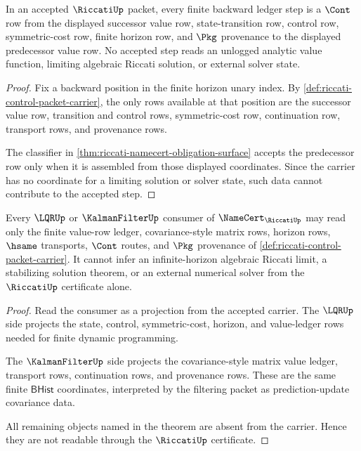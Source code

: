 \begin{theorem}
\label{thm:riccati-finite-ledger-step-closure}
In an accepted $\RiccatiUp$ packet, every finite backward ledger step is a
$\Cont$ row from the displayed successor value row, state-transition row,
control row, symmetric-cost row, finite horizon row, and $\Pkg$ provenance to
the displayed predecessor value row. No accepted step reads an unlogged
analytic value function, limiting algebraic Riccati solution, or external
solver state.
\end{theorem}
\begin{proof}
Fix a backward position in the finite horizon unary index. By
\autoref{def:riccati-control-packet-carrier}, the only rows available at that
position are the successor value row, transition and control rows,
symmetric-cost row, continuation row, transport rows, and provenance rows.

The classifier in \autoref{thm:riccati-namecert-obligation-surface} accepts the
predecessor row only when it is assembled from those displayed coordinates.
Since the carrier has no coordinate for a limiting solution or solver state,
such data cannot contribute to the accepted step.
\end{proof}

\begin{theorem}
\label{thm:riccati-lqr-kalman-consumer-boundary}
Every $\LQRUp$ or $\KalmanFilterUp$ consumer of $\NameCert_{\RiccatiUp}$ may read
only the finite value-row ledger, covariance-style matrix rows, horizon rows,
$\hsame$ transports, $\Cont$ routes, and $\Pkg$ provenance of
\autoref{def:riccati-control-packet-carrier}. It cannot infer an
infinite-horizon algebraic Riccati limit, a stabilizing solution theorem, or an
external numerical solver from the $\RiccatiUp$ certificate alone.
\end{theorem}
\begin{proof}
Read the consumer as a projection from the accepted carrier. The $\LQRUp$ side
projects the state, control, symmetric-cost, horizon, and value-ledger rows
needed for finite dynamic programming.

The $\KalmanFilterUp$ side projects the covariance-style matrix value ledger,
transport rows, continuation rows, and provenance rows. These are the same
finite $\mathsf{BHist}$ coordinates, interpreted by the filtering packet as
prediction-update covariance data.

All remaining objects named in the theorem are absent from the carrier. Hence
they are not readable through the $\RiccatiUp$ certificate.
\end{proof}

